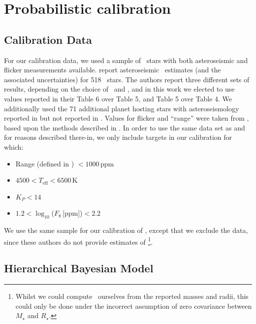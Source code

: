 \section{Probabilistic calibration}
\label{sec:HBM}


\subsection{Calibration Data}

For our calibration data, we used a sample of \Kepler\ stars with
both asteroseismic and flicker measurements available. \citet{chaplin:2014}
report asteroseismic \rhostar\ estimates (and the associated uncertainties) for
518 \Kepler\ stars. The authors report three different sets of results,
depending on the choice of \Teff\ and \FeH, and in this work we elected to use
values reported in their Table 6 over Table 5, and Table 5 over Table 4. We
additionally used the 71 additional planet hosting stars with asteroseismology
reported in \citet{huber:2013} but not reported in \citet{chaplin:2014}. Values
for flicker and ``range'' were taken from \citet{kipping:2014}, based upon the
methods described in \citet{bastien:2013}.
In order to use the same data set as \citet{kipping:2014} and
for reasons described there-in, we only include targets in our calibration for
which:

\begin{itemize}
\item Range (defined in \citealt{bastien:2013})
$<1000$\,ppm
\item $4500<T_{\mathrm{eff}}<6500$\,K
\item $K_P<14$
\item $1.2 < \log_{10}$($F_8$\,[ppm])$< 2.2$
\end{itemize}

We use the same sample for our calibration of \logg, except that we exclude the
\citet{huber:2013} data, since these authors do not provide estimates of
\logg\footnote{Whilst we could compute \logg\ ourselves from the reported
masses and radii, this could only be done under the incorrect assumption of
zero covariance between $M_{\star}$ and $R_{\star}$.}.

\subsection{Hierarchical Bayesian Model}


